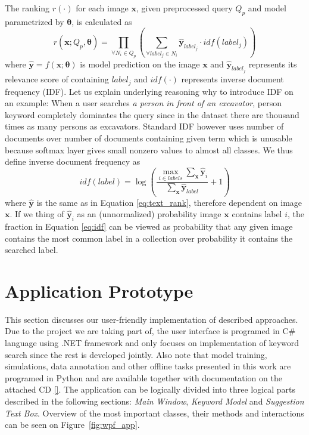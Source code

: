 The ranking $r(\cdot)$ for each image $\bm{x}$, given preprocessed query $Q_p$ and model parametrized by $\bm{\theta}$, is calculated as 
\begin{equation}
r\left(\bm{x}; Q_p, \bm{\theta}\right)=\prod\limits_{\forall N_i \in Q_p}\left(
	\sum\limits_{\forall label_j\in N_i} \bm{\hat{y}}_{label_j}\cdot idf\left(label_j\right)
\right)\label{eq:text_rank}
\end{equation}
where $\bm{\hat{y}}=f\left(\bm{x}; \bm{\theta}\right)$  is model prediction on the image $\bm{x}$ and $\bm{\hat{y}}_{label_j}$ represents its relevance score of containing $label_j$ and $idf(\cdot)$ represents inverse document frequency (IDF). Let us explain underlying reasoning why to introduce IDF on an example: When a user searches \textit{a person in front of an excavator}, person keyword completely dominates the query since in the dataset there are thousand times as many persons as excavators. Standard IDF however uses number of documents over number of documents containing given term which is unusable because softmax layer gives small nonzero values to almost all classes. We thus define inverse document frequency as
\begin{equation}
idf(label) = \log\left(
\frac{
\max\limits_{i\in labels} \sum_{\bm{x}}\hat{\bm{y}}_{i}
}{
\sum_{\bm{x}}\hat{\bm{y}}_{label}
} + 1\right)\label{eq:idf}
\end{equation}
where $\hat{\bm{y}}$ is the same as in Equation \ref{eq:text_rank}, therefore dependent on image $\bm{x}$. If we thing of $\hat{\bm{y}}_i$ as an (unnormalized) probability image $\bm{x}$ contains label $i$, the fraction in Equation \ref{eq:idf} can be viewed as probability that any given image contains the most common label in a collection over probability it contains the searched label.

\section{Application Prototype}\label{chap:application_prototype}
This section discusses our user-friendly implementation of described approaches. Due to the project we are taking part of, the user interface is programed in C\# language using .NET framework and only focuses on implementation of keyword search since the rest is developed jointly. Also note that model training, simulations, data annotation and other offline tasks presented in this work are programed in Python and are available together with documentation on the attached CD \ref{}. The application can be logically divided into three logical parts described in the following sections: \textit{Main Window}, \textit{Keyword Model} and \textit{Suggestion Text Box}. Overview of the most important classes, their methods and interactions can be seen on Figure~\ref{fig:wpf_app}.

